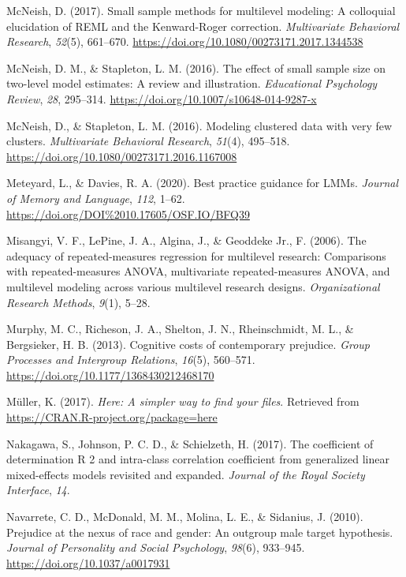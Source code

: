 \documentclass[
  english,
  man, noextraspace,floatsintext]{apa6}
\newlength{\cslhangindent}
\newenvironment{cslreferences}%
  {\setlength{\parindent}{0pt}%
  \everypar{\setlength{\hangindent}{\cslhangindent}}\ignorespaces}%
  {\par}
\begin{document}
\begin{cslreferences}
\leavevmode\hypertarget{ref-McNeish2017}{}%
McNeish, D. (2017). Small sample methods for multilevel modeling: A colloquial elucidation of REML and the Kenward-Roger correction. \emph{Multivariate Behavioral Research}, \emph{52}(5), 661--670. \url{https://doi.org/10.1080/00273171.2017.1344538}

\leavevmode\hypertarget{ref-Mcneish2016a}{}%
McNeish, D. M., \& Stapleton, L. M. (2016). The effect of small sample size on two-level model estimates: A review and illustration. \emph{Educational Psychology Review}, \emph{28}, 295--314. \url{https://doi.org/10.1007/s10648-014-9287-x}

\leavevmode\hypertarget{ref-Mcneish2016}{}%
McNeish, D., \& Stapleton, L. M. (2016). Modeling clustered data with very few clusters. \emph{Multivariate Behavioral Research}, \emph{51}(4), 495--518. \url{https://doi.org/10.1080/00273171.2016.1167008}

\leavevmode\hypertarget{ref-Meteyard2020}{}%
Meteyard, L., \& Davies, R. A. (2020). Best practice guidance for LMMs. \emph{Journal of Memory and Language}, \emph{112}, 1--62. \url{https://doi.org/DOI\%2010.17605/OSF.IO/BFQ39}

\leavevmode\hypertarget{ref-Misangyi2006}{}%
Misangyi, V. F., LePine, J. A., Algina, J., \& Geoddeke Jr., F. (2006). The adequacy of repeated-measures regression for multilevel research: Comparisons with repeated-measures ANOVA, multivariate repeated-measures ANOVA, and multilevel modeling across various multilevel research designs. \emph{Organizational Research Methods}, \emph{9}(1), 5--28.

\leavevmode\hypertarget{ref-Murphy2013}{}%
Murphy, M. C., Richeson, J. A., Shelton, J. N., Rheinschmidt, M. L., \& Bergsieker, H. B. (2013). Cognitive costs of contemporary prejudice. \emph{Group Processes and Intergroup Relations}, \emph{16}(5), 560--571. \url{https://doi.org/10.1177/1368430212468170}

\leavevmode\hypertarget{ref-R-here}{}%
Müller, K. (2017). \emph{Here: A simpler way to find your files}. Retrieved from \url{https://CRAN.R-project.org/package=here}

\leavevmode\hypertarget{ref-Nakagawa2017}{}%
Nakagawa, S., Johnson, P. C. D., \& Schielzeth, H. (2017). The coefficient of determination R 2 and intra-class correlation coefficient from generalized linear mixed-effects models revisited and expanded. \emph{Journal of the Royal Society Interface}, \emph{14}.

\leavevmode\hypertarget{ref-Navarrete2010}{}%
Navarrete, C. D., McDonald, M. M., Molina, L. E., \& Sidanius, J. (2010). Prejudice at the nexus of race and gender: An outgroup male target hypothesis. \emph{Journal of Personality and Social Psychology}, \emph{98}(6), 933--945. \url{https://doi.org/10.1037/a0017931}


\end{cslreferences}
\end{document}
